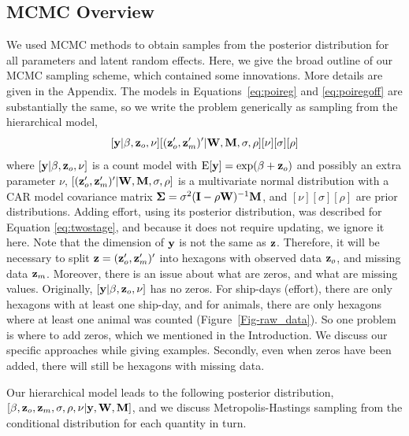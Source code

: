 \documentclass[11pt, titlepage]{article}
\begin{document}
\begin{spacing}{1.9}
\begin{flushleft}

\subsection{MCMC Overview}

We used MCMC methods to obtain samples from the posterior distribution for all parameters and latent random effects.  Here, we give the broad outline of our MCMC sampling scheme, which contained some innovations.  More details are given in the Appendix.  The models in Equations~\eqref{eq:poireg} and \eqref{eq:poiregoff} are substantially the same, so we write the problem generically as sampling from the hierarchical model,
$$
[\mathbf{y}|\beta,\mathbf{z}_{o},\nu][(\mathbf{z}_{o}^{\prime},\mathbf{z}_{m}^{\prime})^{\prime}|\mathbf{W},\mathbf{M},\sigma,\rho][\nu][\sigma][\rho]
$$
where $[\mathbf{y}|\beta,\mathbf{z}_{o},\nu]$ is a count model with $\textrm{E}[\mathbf{y}] = \exp(\beta + \mathbf{z}_{o})$ and possibly an extra parameter $\nu$, $[(\mathbf{z}_{o}^{\prime},\mathbf{z}_{m}^{\prime})^{\prime}|\mathbf{W},\mathbf{M},\sigma,\rho]$ is a multivariate normal distribution with a CAR model covariance matrix $\mbox{\boldmath $\Sigma$} = \sigma^{2}(\mathbf{I} - \rho\mathbf{W})^{-1}\mathbf{M}$, and $[\nu][\sigma][\rho]$ are prior distributions. Adding effort, using its posterior distribution, was described for Equation \eqref{eq:twostage}, and because it does not require updating, we ignore it here. Note that the dimension of $\mathbf{y}$ is not the same as $\mathbf{z}$.  Therefore, it will be necessary to split $\mathbf{z} = (\mathbf{z}_{o}^{\prime},\mathbf{z}_{m}^{\prime})^{\prime}$ into hexagons with observed data $\mathbf{z}_{o}$, and missing data $\mathbf{z}_{m}$.  Moreover, there is an issue about what are zeros, and what are missing values.  Originally, $[\mathbf{y}|\beta,\mathbf{z}_{o},\nu]$ has no zeros. For ship-days (effort), there are only hexagons with at least one ship-day, and for animals, there are only hexagons where at least one animal was counted (Figure~\ref{Fig-raw_data}).  So one problem is where to add zeros, which we mentioned in the Introduction.  We discuss our specific approaches while giving examples.  Secondly, even when zeros have been added, there will still be hexagons with missing data.  

Our hierarchical model leads to the following posterior distribution, $[\beta,\mathbf{z}_{o},\mathbf{z}_{m},\sigma,\rho,\nu|\mathbf{y},\mathbf{W},\mathbf{M}]$, and we discuss Metropolis-Hastings sampling from the conditional distribution for each quantity in turn.


\end{flushleft}
\end{spacing}
\end{document}
